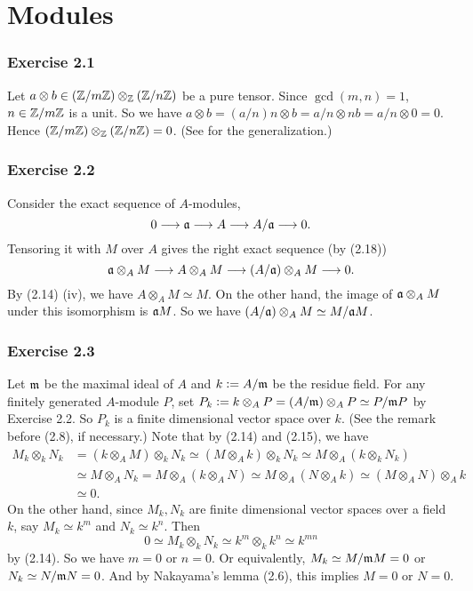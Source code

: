 \documentclass[../A&M.tex]{subfiles}
\begin{document}
\chapter{Modules}

\subsection*{Exercise 2.1}

Let $a \otimes b \in (\mathbb{Z}/m\mathbb{Z}) \otimes_{\mathbb{Z}} (\mathbb{Z}/n\mathbb{Z})$ be a pure tensor. Since $\gcd(m,n)=1$, $n\in \mathbb{Z}/m\mathbb{Z}$ is a unit. So we have $a \otimes b = (a/n)n \otimes b = a/n \otimes nb = a/n \otimes 0 = 0$. Hence $(\mathbb{Z}/m\mathbb{Z}) \otimes_{\mathbb{Z}} (\mathbb{Z}/n\mathbb{Z}) = 0$. (See  for the generalization.)

\subsection*{Exercise 2.2}

Consider the exact sequence of $A$-modules,
$$
0 \longrightarrow \mathfrak{a} \longrightarrow A \longrightarrow A/\mathfrak{a} \longrightarrow 0.
$$
Tensoring it with $M$ over $A$ gives the right exact sequence (by (2.18))
$$
\mathfrak{a} \otimes_A M \longrightarrow A \otimes_A M \longrightarrow (A/\mathfrak{a}) \otimes_A M \longrightarrow 0.
$$
By (2.14) (iv), we have $A \otimes_A M \simeq M$. On the other hand, the image of $\mathfrak{a} \otimes_A M$ under this isomorphism is $\mathfrak{a} M$. So we have $(A/\mathfrak{a}) \otimes_A M \simeq M/\mathfrak{a} M$.

\subsection*{Exercise 2.3}

Let $\mathfrak{m}$ be the maximal ideal of $A$ and $k:=A/\mathfrak{m}$ be the residue field. For any finitely generated $A$-module $P$, set $P_k := k \otimes_A P = (A/\mathfrak{m}) \otimes_A P \simeq P/\mathfrak{m} P$ by Exercise 2.2. So $P_k$ is a finite dimensional vector space over $k$. (See the remark before (2.8), if necessary.) Note that by (2.14) and (2.15), we have
\begin{align*}
	M_k \otimes_k N_k
	&= (k \otimes_A M) \otimes_k N_k
	\simeq (M \otimes_A k) \otimes_k N_k
	\simeq M \otimes_A (k \otimes_k N_k)     \\
	&\simeq M \otimes_A N_k
	= M \otimes_A (k \otimes_A N)
	\simeq M \otimes_A (N \otimes_A k)
	\simeq (M \otimes_A N) \otimes_A k    \\
	&\simeq 0.	
\end{align*}
On the other hand, since $M_k,N_k$ are finite dimensional vector spaces over a field $k$, say $M_k \simeq k^m$ and $N_k\simeq k^n$. Then
$$
0 \simeq M_k \otimes_k N_k \simeq k^m \otimes_k k^n \simeq k^{mn}
$$
by (2.14). So we have $m=0$ or $n=0$. Or equivalently, $M_k \simeq M/\mathfrak{m} M = 0$ or $N_k \simeq N/\mathfrak{m} N = 0$. And by Nakayama's lemma (2.6), this implies $M=0$ or $N=0$.
\end{document}
